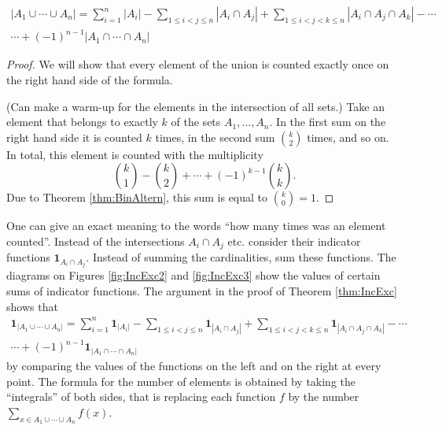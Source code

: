 \begin{page}

\begin{thm}
\label{thm:IncExc}
\begin{multline*}
|A_1 \cup \cdots \cup A_n| = \sum_{i=1}^n |A_i| - \sum_{1 \le i < j \le n} |A_i \cap A_j| 
+ \sum_{1 \le i < j < k \le n} |A_i \cap A_j \cap A_k| - \cdots \\
\cdots +(-1)^{n-1} |A_1 \cap \cdots \cap A_n|
\end{multline*}
\end{thm}

\end{page}

\begin{page}

\begin{proof}
We will show that every element of the union is counted exactly once on the right hand side of the formula.

(Can make a warm-up for the elements in the intersection of all sets.)
Take an element that belongs to exactly $k$ of the sets $A_1, \ldots, A_n$.
In the first sum on the right hand side it is counted $k$ times,
in the second sum $\binom{k}{2}$ times, and so on.
In total, this element is counted with the multiplicity
\[
\binom{k}{1} - \binom{k}{2} + \cdots + (-1)^{k-1}\binom{k}{k}.
\]
Due to Theorem \ref{thm:BinAltern}, this sum is equal to $\binom{k}{0} = 1$.
\end{proof}


\end{page}

\begin{page}

\begin{rem}
One can give an exact meaning to the words ``how many times was an element counted''.
Instead of the intersections $A_i \cap A_j$ etc. consider their indicator functions $\mathbf{1}_{A_i \cap A_j}$.
Instead of summing the cardinalities, sum these functions.
The diagrams on Figures \ref{fig:IncExc2} and \ref{fig:IncExc3} show the values of certain sums of indicator functions.
The argument in the proof of Theorem \ref{thm:IncExc} shows that
\begin{multline*}
\mathbf{1}_{|A_1 \cup \cdots \cup A_n|} = \sum_{i=1}^n \mathbf{1}_{|A_i|} - \sum_{1 \le i < j \le n} \mathbf{1}_{|A_i \cap A_j|} 
+ \sum_{1 \le i < j < k \le n} \mathbf{1}_{|A_i \cap A_j \cap A_k|} - \cdots \\
\cdots +(-1)^{n-1} \mathbf{1}_{|A_1 \cap \cdots \cap A_n|}
\end{multline*}
by comparing the values of the functions on the left and on the right at every point.
The formula for the number of elements is obtained by taking the ``integrals'' of both sides,
that is replacing each function $f$ by the number $\sum_{x \in A_1 \cup \cdots \cup A_n} f(x)$.
\end{rem}

\end{page}

